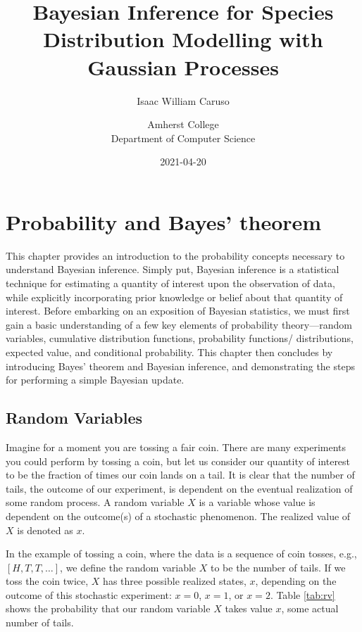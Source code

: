 \documentclass[
  12pt,
]{book}
\title{Bayesian Inference for Species Distribution Modelling with Gaussian Processes}
\subtitle{Isaac William Caruso}
\author{Amherst College\\
Department of Computer Science}
\date{2021-04-20}
\theoremstyle{definition}
\theoremstyle{definition}
\theoremstyle{definition}
\theoremstyle{remark}
\begin{document}
\maketitle

{
\setcounter{tocdepth}{1}
\tableofcontents
}
\hypertarget{probability-and-bayes-theorem}{%
\chapter{Probability and Bayes' theorem}\label{probability-and-bayes-theorem}}

This chapter provides an introduction to the probability concepts necessary to understand Bayesian inference.
Simply put, Bayesian inference is a statistical technique for estimating a quantity of interest upon the observation of data, while explicitly incorporating prior knowledge or belief about that quantity of interest.
Before embarking on an exposition of Bayesian statistics, we must first gain a basic understanding of a few key elements of probability theory---random variables, cumulative distribution functions, probability functions/ distributions, expected value, and conditional probability.
This chapter then concludes by introducing Bayes' theorem and Bayesian inference, and demonstrating the steps for performing a simple Bayesian update.

\hypertarget{random-variables}{%
\section{Random Variables}\label{random-variables}}

Imagine for a moment you are tossing a fair coin.
There are many experiments you could perform by tossing a coin, but let us consider our quantity of interest to be the fraction of times our coin lands on a tail.
It is clear that the number of tails, the outcome of our experiment, is dependent on the eventual realization of some random process.
A random variable \(X\) is a variable whose value is dependent on the outcome(s) of a stochastic phenomenon.
The realized value of \(X\) is denoted as \(x\).

In the example of tossing a coin, where the data is a sequence of coin tosses, e.g., \([H, T, T, …]\), we define the random variable \(X\) to be the number of tails.
If we toss the coin twice, \(X\) has three possible realized states, \(x\), depending on the outcome of this stochastic experiment: \(x = 0\), \(x = 1\), or \(x = 2\).
Table \ref{tab:rv} shows the probability that our random variable \(X\) takes value \(x\), some actual number of tails.
\end{document}
